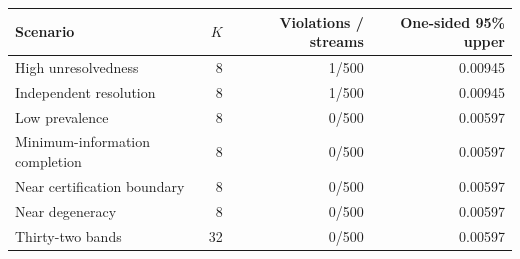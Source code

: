 \begin{tabular}{lrrr}\toprule Scenario & $K$ & Violations / streams & One-sided 95\% upper\\\midrule
High unresolvedness & 8 & 1/500 & 0.00945\\
Independent resolution & 8 & 1/500 & 0.00945\\
Low prevalence & 8 & 0/500 & 0.00597\\
Minimum-information completion & 8 & 0/500 & 0.00597\\
Near certification boundary & 8 & 0/500 & 0.00597\\
Near degeneracy & 8 & 0/500 & 0.00597\\
Thirty-two bands & 32 & 0/500 & 0.00597\\\bottomrule\end{tabular}
